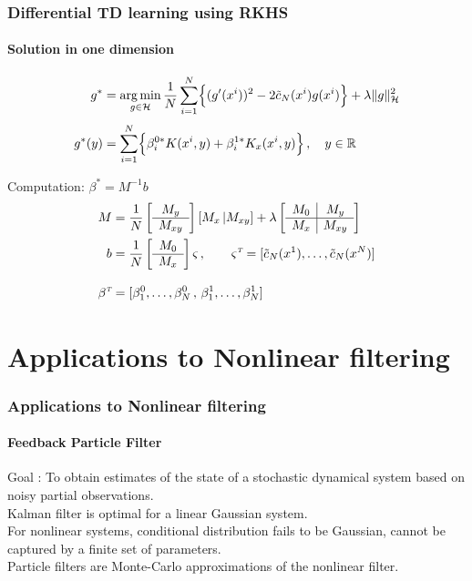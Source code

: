 \documentclass[xcolor=dvipsnames, subsection=false]{beamer}
\def\clH{{\mathcal H}}
\def\tilc{\tilde c}
\def\transpose{{\hbox{\it\tiny T}}}
\newcommand{\field}[1]{\mathbb{#1}}
\def\Re{\field{R}}
\def\argmin{\mathop{\rm arg\, min}}
\begin{document}
\begin{frame}
\frametitle{Differential TD learning using RKHS}
\framesubtitle{Solution in one dimension}

\begin{minipage}[t][6.5cm][t]{\textwidth}
	
	
	
	\[
	\begin{aligned}
	g^* &= \argmin_{g\in\clH} \frac{1}{N} \sum_{i=1}^N \Bigl\{ (g'(x^i))^2 - 2 \tilc_N(x^i) g(x^i) \Bigr\} + \lambda \|g\|^2_\clH
	\\[.3em]
	g^*(y)
	& = \sum_{i=1}^N \Bigl\{
	\beta_i^{0*}  K(x^i, y)   +   \beta_i^{1*}  K_x(x^i, y)  \Bigr\}  \,,\quad y\in\Re
	\end{aligned}
	\]
	
	\pause
	Computation:	\alert{	$\beta^* = M^{-1} b$}
	{\small
		\[
		\begin{aligned}
		M  &= \frac{1}{N} \left[\begin{array}{c} M_y\\ \hline M_{xy} \end{array}\right] [M_x \,| M_{xy}] + \lambda  \left[
		\begin{array}{c|c}
		M_0& M_y \\
		\hline
		M_x & M_{xy}
		\end{array}
		\right]
		\\
		b &=  \frac{1}{N} \left[ \begin{array}{c} M_0 \\ \hline M_x \end{array}\right] \mathbf{\varsigma}\,, \qquad  \mathbf{\varsigma}^\transpose = [\tilc_N(x^1) ,\dots, \tilc_N(x^N)]
		\\[.3cm]
		\beta^\transpose   &=  [\beta_1^0 ,\dots,  \beta_N^0 \,,\, \beta_1^1 ,\dots,  \beta_N^1]
		\end{aligned}
		\]
	}
\end{minipage}
\end{frame}

\section{Applications to Nonlinear filtering}
\begin{frame}
\frametitle{Applications to Nonlinear filtering}
\framesubtitle{Feedback Particle Filter}
Goal : To obtain estimates of the state of a stochastic dynamical system based on noisy partial observations. \\[0.2cm]
Kalman filter is optimal for a linear Gaussian system.\\[0.2cm]
For nonlinear systems, conditional distribution fails to be Gaussian, cannot be captured by a finite set of parameters.\\[0.2cm]
Particle filters are Monte-Carlo approximations of the nonlinear filter.
\end{frame}
\end{document}
